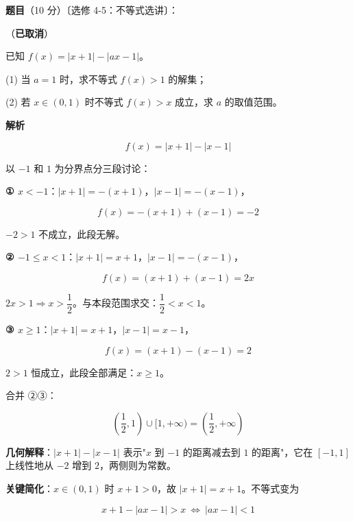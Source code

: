 \begin{answer}

\textbf{题目}（10 分）〔选修 4-5：不等式选讲〕：

（\textbf{已取消}）

已知 $f(x)=|x+1|-|ax-1|$。

  (1) 当 $a=1$ 时，求不等式 $f(x)>1$ 的解集；

  (2) 若 $x\in(0,1)$ 时不等式 $f(x)>x$ 成立，求 $a$ 的取值范围。

\par\medskip

\textbf{解析}


\nopagebreak[4]
\[f(x)=|x+1|-|x-1|\]

以 $-1$ 和 $1$ 为分界点分三段讨论：

\textbf{① $x<-1$}：$|x+1|=-(x+1)$，$|x-1|=-(x-1)$，

\nopagebreak[4]
\[f(x)=-(x+1)+(x-1)=-2\]

$-2>1$ 不成立，此段无解。

\textbf{② $-1\le x<1$}：$|x+1|=x+1$，$|x-1|=-(x-1)$，

\nopagebreak[4]
\[f(x)=(x+1)+(x-1)=2x\]

$2x>1\Rightarrow x>\dfrac12$。与本段范围求交：$\dfrac12<x<1$。

\textbf{③ $x\ge1$}：$|x+1|=x+1$，$|x-1|=x-1$，

\nopagebreak[4]
\[f(x)=(x+1)-(x-1)=2\]

$2>1$ 恒成立，此段全部满足：$x\ge1$。

合并 ②③：

\nopagebreak[4]
\[\left(\frac12,1\right)\cup[1,+\infty)=\left(\frac12,+\infty\right)\]

\begin{gktip}
\textbf{几何解释}：$|x+1|-|x-1|$ 表示"$x$ 到 $-1$ 的距离减去到 $1$ 的距离"，它在 $[-1,1]$ 上线性地从 $-2$ 增到 $2$，两侧则为常数。
\end{gktip}


\textbf{关键简化}：$x\in(0,1)$ 时 $x+1>0$，故 $|x+1|=x+1$。不等式变为

\nopagebreak[4]
\[x+1-|ax-1|>x\ \Longleftrightarrow\ |ax-1|<1\]


\end{answer}
